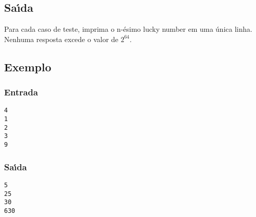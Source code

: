 \documentclass[14pt]{article}
\begin{document}
\subsection{Sa\'{\i}da}
Para cada caso de teste, imprima o n-\'esimo lucky number em uma \'unica linha. Nenhuma resposta excede o valor de $2^{64}$.

\subsection{Exemplo}
\subsubsection{Entrada}
\begin{verbatim}
4
1
2
3
9
 \end{verbatim}
\subsubsection{Sa\'{\i}da}
 \begin{verbatim}
5
25
30
630
 \end{verbatim}
\end{document}
